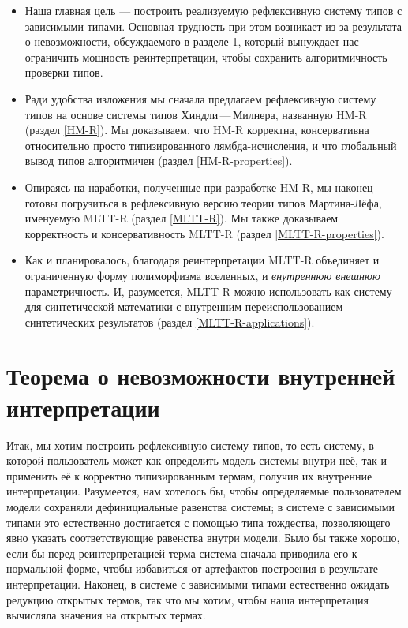 \begin{itemize}
    \item Наша главная цель --- построить реализуемую
        рефлексивную систему типов с зависимыми типами.
        Основная трудность при этом возникает из-за
        результата о невозможности, обсуждаемого в
        разделе \ref{no-go-section}, который вынуждает
        нас ограничить мощность реинтерпретации, чтобы
        сохранить алгоритмичность проверки типов.
    \item Ради удобства изложения мы сначала предлагаем
        рефлексивную систему типов на основе системы
        типов Хиндли\,---\,Милнера, названную HM-R
        (раздел \ref{HM-R}). Мы доказываем, что HM-R
        корректна, консервативна относительно просто
        типизированного лямбда-исчисления, и что
        глобальный вывод типов алгоритмичен (раздел
        \ref{HM-R-properties}).
    \item Опираясь на наработки, полученные при
        разработке HM-R, мы наконец готовы погрузиться
        в рефлексивную версию теории типов
        Мартина-Лёфа, именуемую MLTT-R (раздел
        \ref{MLTT-R}). Мы также доказываем корректность
        и консервативность MLTT-R (раздел
        \ref{MLTT-R-properties}).
    \item Как и планировалось, благодаря
        реинтерпретации MLTT-R объединяет и
        ограниченную форму полиморфизма вселенных, и
        \textit{внутреннюю внешнюю} параметричность. И,
        разумеется, MLTT-R можно использовать как
        систему для синтетической математики с
        внутренним переиспользованием синтетических
        результатов (раздел \ref{MLTT-R-applications}).
\end{itemize}

\section
{Теорема о невозможности внутренней интерпретации}
\label{no-go-section}

Итак, мы хотим построить рефлексивную систему типов, то
есть систему, в которой пользователь может как
определить модель системы внутри неё, так и применить
её к корректно типизированным термам, получив их
внутренние интерпретации. Разумеется, нам хотелось бы,
чтобы определяемые пользователем модели сохраняли
дефинициальные равенства системы; в системе с
зависимыми типами это естественно достигается с помощью
типа тождества, позволяющего явно указать
соответствующие равенства внутри модели. Было бы также
хорошо, если бы перед реинтерпретацией терма система
сначала приводила его к нормальной форме, чтобы
избавиться от артефактов построения в результате
интерпретации. Наконец, в системе с зависимыми типами
естественно ожидать редукцию открытых термов, так что
мы хотим, чтобы наша интерпретация вычисляла значения
на открытых термах.

